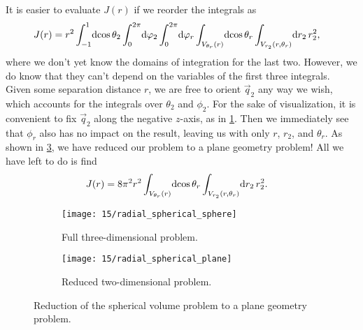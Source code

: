 It is easier to evaluate $J(r)$ if we reorder the integrals as
\begin{align}
	J(r)
	&= r^2 \int_{-1}^1\! \dif \cos{\theta_2} \int_0^{2 \pi}\! \dif \phi_2 \int_0^{2 \pi}\! \dif \phi_r \int_{V_{\theta_r}(r)}\! \dif \cos{\theta_r} \int_{V_{r_2}(r, \theta_r)}\! \dif r_2 \, r_2^2,
\end{align}
where we don't yet know the domains of integration for the last two.
However, we do know that they can't depend on the variables of the first three integrals.
Given some separation distance $r$, we are free to orient $\vec{q}_2$ any way we wish, which accounts for the integrals over $\theta_2$ and $\phi_2$.
For the sake of visualization, it is convenient to fix $\vec{q}_2$ along the negative $z$-axis, as in \cref{fig:radial-spherical-sphere}.
Then we immediately see that $\phi_r$ also has no impact on the result, leaving us with only $r$, $r_2$, and $\theta_r$.
As shown in \cref{fig:radial-spherical-plane}, we have reduced our problem to a plane geometry problem!
All we have left to do is find
\begin{align}
	J(r)
	&= 8 \pi^2 r^2 \int_{V_{\theta_r}(r)}\! \dif \cos{\theta_r}
		\int_{V_{r_2}(r, \theta_r)}\! \dif r_2 \, r_2^2.
\end{align}

\begin{figure}
	\centering
	\begin{subfigure}[b]{0.45\textwidth}
		\centering
		\texttt{[image: 15/radial\_spherical\_sphere]}
		\caption{
			Full three-dimensional problem.
		}
		\label{fig:radial-spherical-sphere}
	\end{subfigure}
	\hfill
	\begin{subfigure}[b]{0.45\textwidth}
		\centering
		\texttt{[image: 15/radial\_spherical\_plane]}
		\vspace{5.2 mm}
		\caption{
			Reduced two-dimensional problem.
		}
		\label{fig:radial-spherical-plane}
	\end{subfigure}
	\caption[
		Reduction of spherical volume problem
	]{
		Reduction of the spherical volume problem to a plane geometry problem.
	}
\end{figure}

